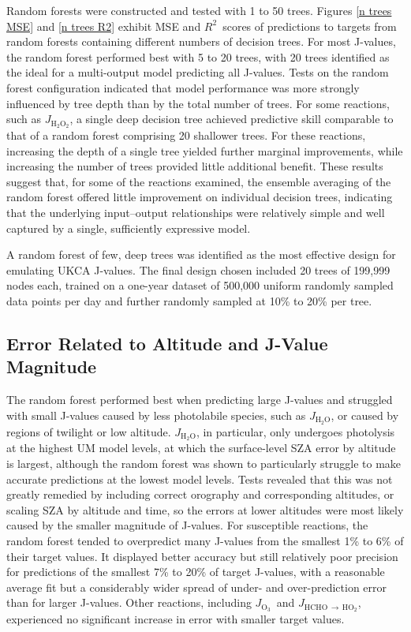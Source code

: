 \documentclass[journal abbreviation, manuscript]{copernicus}
\newcommand{\RR}{\ensuremath{R^2}}
\newcommand{\JOOO}{\ensuremath{J_{\mathrm{O_3}}}}
\newcommand{\JHCHOr}{\ensuremath{J_{\mathrm{HCHO} \,\to\, \mathrm{HO_2}}}}
\newcommand{\JHHO}{\ensuremath{J_{\mathrm{H_2O}}}}
\newcommand{\JHHOO}{\ensuremath{J_{\mathrm{H_2O_2}}}}
\begin{document}
Random forests were constructed and tested with 1 to 50 trees. Figures \ref{n trees MSE} and \ref{n trees R2} exhibit MSE and \RR\ scores of predictions to targets from random forests containing different numbers of decision trees. For most J-values, the random forest performed best with 5 to 20 trees, with 20 trees identified as the ideal for a multi-output model predicting all J-values.
Tests on the random forest configuration indicated that model performance was more strongly influenced by tree depth than by the total number of trees. For some reactions, such as \JHHOO, a single deep decision tree achieved predictive skill comparable to that of a random forest comprising 20 shallower trees. For these reactions, increasing the depth of a single tree yielded further marginal improvements, while increasing the number of trees provided little additional benefit. These results suggest that, for some of the reactions examined, the ensemble averaging of the random forest offered little improvement on individual decision trees, indicating that the underlying input–output relationships were relatively simple and well captured by a single, sufficiently expressive model.

A random forest of few, deep trees was identified as the most effective design for emulating UKCA J-values. The final design chosen included 20 trees of 199,999 nodes each, trained on a one-year dataset of 500,000 uniform randomly sampled data points per day and further randomly sampled at 10\% to 20\% per tree.   


\subsection{Error Related to Altitude and J-Value Magnitude}

The random forest performed best when predicting large J-values and struggled with small J-values caused by less photolabile species, such as \JHHO, or caused by regions of twilight or low altitude. \JHHO, in particular, only undergoes photolysis at the highest UM model levels, at which the surface-level SZA error by altitude is largest, although the random forest was shown to particularly struggle to make accurate predictions at the lowest model levels. Tests revealed that this was not greatly remedied by including correct orography and corresponding altitudes, or scaling SZA by altitude and time, so the errors at lower altitudes were most likely caused by the smaller magnitude of J-values. For susceptible reactions, the random forest tended to overpredict many J-values from the smallest 1\% to 6\% of their target values. It displayed better accuracy but still relatively poor precision for predictions of the smallest 7\% to 20\% of target J-values, with a reasonable average fit but a considerably wider spread of under- and over-prediction error than for larger J-values. Other reactions, including \JOOO\ and \JHCHOr, experienced no significant increase in error with smaller target values.
\end{document}
